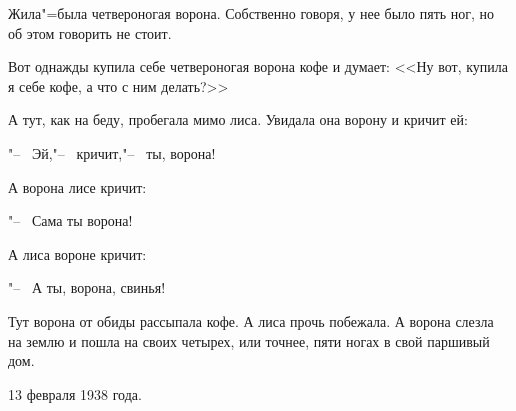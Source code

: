 Жила"=была четвероногая ворона. Собственно говоря, у нее было пять ног, но об этом говорить не стоит.

Вот однажды купила себе четвероногая ворона кофе и думает: <<Ну вот, купила я себе кофе, а что с ним делать?>>

А тут, как на беду, пробегала мимо лиса. Увидала она ворону и кричит ей:

"--~ Эй,"--~ кричит,"--~ ты, ворона!

А ворона лисе кричит:

"--~ Сама ты ворона!

А лиса вороне кричит:

"--~ А ты, ворона, свинья!

Тут ворона от обиды рассыпала кофе. А лиса прочь побежала. А ворона слезла на землю и пошла на своих четырех, или точнее, пяти ногах в свой паршивый дом.

\begin{flushright}
    13 февраля 1938 года.
\end{flushright}
